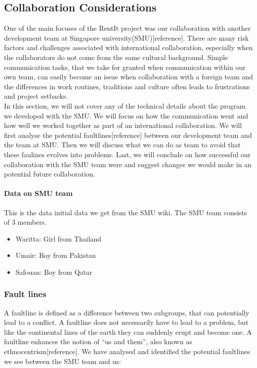 \documentclass[a4paper,11pt,report]{article}
\begin{document}
{\subsection{Collaboration Considerations}
One of the main focuses of the RentIt project was our collaboration with another development team at Singapore university(SMU)[reference]. There are many risk factors and challenges associated with international collaboration, especially when the collaborators do not come from the same cultural background. Simple communication tasks, that we take for granted when communication within our own team, can easily become an issue when collaboration with a foreign team and the differences in work routines, traditions and culture often leads to frustrations and project setbacks. \\

In this section, we will not cover any of the technical details about the program we developed with the SMU. We will focus on how the communication went and how well we worked together as part of an international collaboration. We will first analyse the potential faultlines[reference] between our development team and the team at SMU. Then we will discuss what we can do as team to avoid that these faulines evolves into problems. Last, we will conclude on how successful our collaboration with the SMU team were and suggest changes we would make in an potential future collaboration.\\

\paragraph{Data on SMU team}

This is the data initial data we get from the SMU wiki. The SMU team consists of 3 members.\\

\begin{itemize}
\item Waritta: Girl from Thailand
\item Umair: Boy from Pakistan
\item Safouan: Boy from Qatar
\end{itemize}

\subsubsection{Fault lines}
A faultline is defined as a difference between two subgroups, that can potentially lead to a conflict. A faultline does not necessarily have to lead to a problem, but like the continental lines of the earth they can suddenly erupt and become one. A faultline enhances the notion of “us and them”, also known as ethnocentrism[reference]. We have analysed and identified the potential faultlines we see between the SMU team and us:

}
\end{document}
